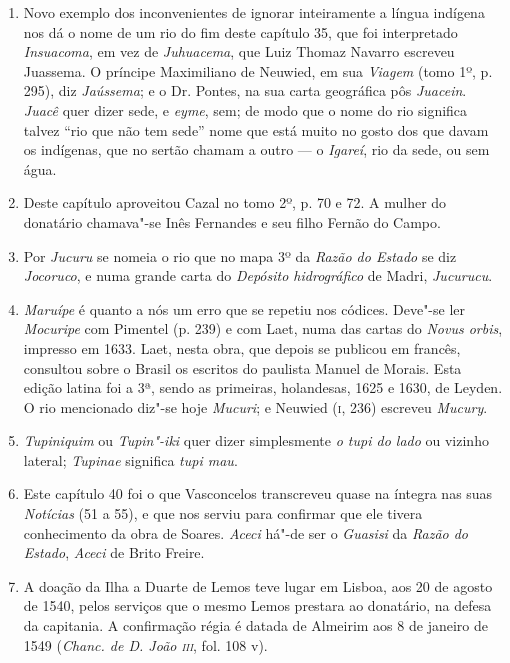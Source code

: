 \begin{enumerate}
\item Novo exemplo dos inconvenientes de ignorar inteiramente a língua indígena nos dá 
o nome de um rio do fim deste capítulo 35, que foi interpretado \textit{Insuacoma}, 
em vez de \textit{Juhuacema}, que Luiz Thomaz Navarro escreveu Juassema. O príncipe Maximiliano de 
Neuwied, em sua \textit{Viagem} (tomo 1º, p. 295), diz \textit{Jaússema}; e o Dr. Pontes, na sua carta 
geográfica pôs \textit{Juacein}. \textit{Juacê} quer dizer sede, e \textit{eyme}, sem; de modo que o nome do rio 
significa talvez ``rio que não tem sede''  nome que está muito no gosto dos que davam 
os indígenas, que no sertão chamam a outro --- o \textit{Igareí}, rio da sede, ou sem água.

\item Deste capítulo aproveitou Cazal no tomo 2º, p. 70 e 72. A mulher do donatário 
chamava"-se Inês Fernandes e seu filho Fernão do Campo.

\item Por \textit{Jucuru} se nomeia o rio que no mapa 3º da \textit{Razão do Estado} se diz \textit{Jocoruco}, e 
numa grande carta do \textit{Depósito hidrográfico} de Madri, \textit{Jucurucu}.

\item \textit{Maruípe} é quanto a nós um erro que se repetiu nos códices. Deve"-se ler \textit{Mocuripe} 
com Pimentel (p. 239) e com Laet, numa das cartas do \textit{Novus orbis}, impresso em 1633. 
Laet, nesta obra, que depois se publicou em francês, consultou sobre o Brasil os 
escritos do paulista Manuel de Morais. Esta edição latina foi a 3ª, sendo as primeiras, 
holandesas, 1625 e 1630, de Leyden. O rio mencionado diz"-se hoje \textit{Mucuri}; e Neuwied 
(\textsc{i}, 236) escreveu \textit{Mucury}.

\item \textit{Tupiniquim} ou \textit{Tupin"-iki} quer dizer simplesmente \textit{o tupi do lado} ou  vizinho lateral; 
\textit{Tupinae} significa \textit{tupi mau}.

\item  Este capítulo 40 foi o que Vasconcelos transcreveu quase na íntegra
nas suas \textit{Notícias} (51 a 55), e que nos serviu para confirmar que ele tivera conhecimento da obra
de Soares. \textit{Aceci} há"-de ser o \textit{Guasisi} da \textit{Razão do Estado}, \textit{Aceci} 
de Brito Freire.

\item A doação da Ilha a Duarte de Lemos teve lugar em Lisboa, aos 20 de agosto de 
1540, pelos serviços que o mesmo Lemos prestara ao donatário, na defesa da capitania. 
A confirmação régia é datada de Almeirim aos 8 de janeiro de 1549 (\textit{Chanc. de D. 
João \textsc{iii}}, fol. 108 v).


\end{enumerate}
